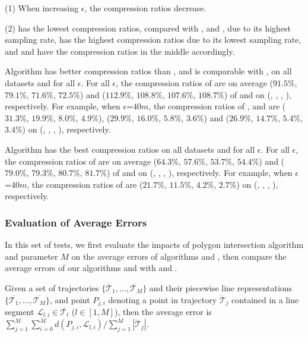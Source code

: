 \ni (1) When increasing $\epsilon$, the compression ratios decrease.

\ni (2) \pricar has the lowest compression ratios, compared with \truck, \sercar and \geolife, due to its highest sampling rate,
\truck has the highest compression ratios due to its lowest sampling rate, and \sercar and \geolife have the compression ratios in the middle accordingly.

 Algorithm \cist has better compression ratios than \squishe, and is {comparable} with \dps, on all datasets and for all $\epsilon$.
For all $\epsilon$, the compression ratios of \cist are on average ($91.5\%$, $79.1\%$, $71.6\%$, {$72.5\%$}) and ($112.9\%$, $108.8\%$, $107.6\%$, $108.7\%$) of \squishe and \dps on (\truck, \sercar, \geolife, \pricar), respectively.
For example, when $\epsilon$=$40m$, the compression ratios of \squishe, \cist and \dps are ($31.3\%$, $19.9\%$, $8.0\%$, $4.9\%$), ($29.9\%$, $16.0\%$, $5.8\%$, $3.6\%$) and ($26.9\%$, $14.7\%$, $5.4\%$, $3.4\%$) on (\truck, \sercar, \geolife, \pricar), respectively.

 Algorithm \cista has {the best} compression ratios on all datasets and for all $\epsilon$.
For all $\epsilon$, the compression ratios of \cista are on average ($64.3\%$, $57.6\%$, $53.7\%$, {$54.4\%$}) and ($79.0\%$, $79.3\%$, $80.7\%$, $81.7\%$) of \squishe and \dps on (\truck, \sercar, \geolife, \pricar), respectively.
For example, when $\epsilon$=$40m$, the compression ratios of \cista are ($21.7\%$, $11.5\%$, $4.2\%$, $2.7\%$) on (\truck, \sercar, \geolife, \pricar), respectively.






\subsubsection{Evaluation of Average Errors}
In this set of tests, we first evaluate the impacts of polygon intersection algorithm \rpia and parameter $M$ on the average errors of algorithms \cist and \cista, then compare the average errors of our algorithms \cist and \cista with \dps and \squishe.

Given a set of trajectories $\{\dddot{\mathcal{T}_1}, \ldots, \dddot{\mathcal{T}_M}\}$ and their piecewise line representations $\{\overline{\mathcal{T}_1}, \ldots, \overline{\mathcal{T}_M}\}$, and point $P_{j,i}$ denoting
a point in trajectory $\dddot{\mathcal{T}}_j$ contained in a line segment $\mathcal{L}_{l,i}\in\overline{\mathcal{T}_l}$ ($l\in[1,M]$),
then the average error is $\sum_{j=1}^{M}\sum_{i=0}^{M} d(P_{j,i},
\mathcal{L}_{l,i})/\sum_{j=1}^{M}{|\dddot{\mathcal{T}}_j |}$.


